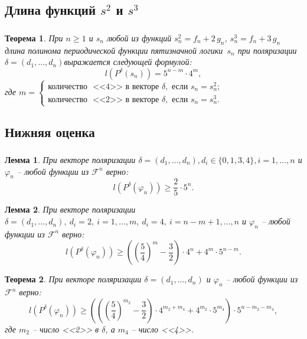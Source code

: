 \documentclass[t]{beamer}
\newtheorem{myth}{Теорема}
\newtheorem{mylm}{Лемма}
\newcommand{\pphi}[1] {P^{\delta}(\varphi_{#1})}
\begin{document}
\subsection{Длина функций $s^2$ и $s^3$}
\begin{frame}
\frametitle{\insertsection}
\framesubtitle{\insertsubsection}
\begin{myth}
\label{ths}
При $n \geqslant 1$ и $s_n$ любой из функций ${s^2_n = f_n + 2\,g_n}$, ${s^3_n = f_n + 3\,g_n}$
длина полинома периодической функции пятизначной логики~$s_n$
при поляризации $\delta = (d_1,\ldots,d_n)$выражается следующей формулой:
$$ l(P^{\delta}(s_n)) = 5^{n-m} \cdot 4^m ,$$
где $m = \begin{cases}
\text{количество } \text{ <<4>> в векторе } \delta, \text{ если } s_n = s^2_n; \\
\text{количество } \text{ <<2>> в векторе } \delta, \text{ если } s_n = s^3_n.
\end{cases}$
\end{myth}
\end{frame}

\subsection{Нижняя оценка}
\begin{frame}
\frametitle{\insertsection}
\framesubtitle{\insertsubsection}
 {
\begin{mylm}
При векторе поляризации $\delta = (d_1,\dots,d_n), d_i \in \{0,1,3,4\}, i = 1,\dots,n$ и
$\varphi_n$ -- любой функции из $\mathcal{F}^n$ верно:
$$l(\pphi{n}) \geqslant \frac{2}{5} \cdot 5^n.$$
\end{mylm}
}
 {
\begin{mylm}
\label{lm24l}
При векторе поляризации $\delta=(d_1,\dots,d_n),\ d_i = 2,\ i=1,\dots,m,\ d_i=4,{\ i=n-m+1,\dots,n}$
и $\varphi_n$ -- любой функции из $\mathcal{F}^n$ верно:
$$l(\pphi{n})\geqslant\left(\left(\frac{5}{4}\right)^m-\frac{3}{2}\right)\cdot4^n+4^m\cdot5^{n-m}.$$
\end{mylm}
}
 {
\begin{myth}
При векторе поляризации $\delta=(d_1,\dots,d_n)$ и $\varphi_n$ -- любой функции из
$\mathcal{F}^n$ верно: $$l(\pphi{n}) \geqslant \left(\left(\left(\frac{5}{4}\right)^{m_2}-
\frac{3}{2}\right) \cdot 4^{m_2+m_4}+4^{m_2}\cdot 5^{m_4} \right) \cdot 5^{n-m_2-m_4},$$
где $m_2$ -- число <<2>> в $\delta$, а $m_4$ -- число <<4>>.
\end{myth}
}
\end{frame}
\end{document}
